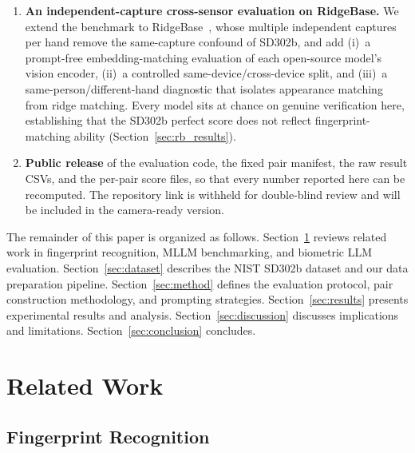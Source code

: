 \documentclass[journal]{IEEEtran}
\begin{document}
\begin{enumerate}
  \item \textbf{An independent-capture cross-sensor evaluation on RidgeBase.}
        We extend the benchmark to RidgeBase~\cite{ridgebase2022}, whose
        multiple independent captures per hand remove the same-capture confound
        of SD302b, and add (i)~a prompt-free embedding-matching evaluation of
        each open-source model's vision encoder, (ii)~a controlled
        same-device/cross-device split, and (iii)~a same-person/different-hand
        diagnostic that isolates appearance matching from ridge matching. Every
        model sits at chance on genuine verification here, establishing that the
        SD302b perfect score does not reflect fingerprint-matching ability
        (Section~\ref{sec:rb_results}).

  \item \textbf{Public release} of the evaluation code, the fixed pair
        manifest, the raw result CSVs, and the per-pair score files, so that
        every number reported here can be recomputed. The repository link is
        withheld for double-blind review and will be included in the
        camera-ready version.
\end{enumerate}

The remainder of this paper is organized as follows.
Section~\ref{sec:related} reviews related work in fingerprint recognition,
MLLM benchmarking, and biometric LLM evaluation.
Section~\ref{sec:dataset} describes the NIST SD302b dataset and our
data preparation pipeline.
Section~\ref{sec:method} defines the evaluation protocol, pair construction
methodology, and prompting strategies.
Section~\ref{sec:results} presents experimental results and analysis.
Section~\ref{sec:discussion} discusses implications and limitations.
Section~\ref{sec:conclusion} concludes.

\section{Related Work}
\label{sec:related}

\subsection{Fingerprint Recognition}
\end{document}
